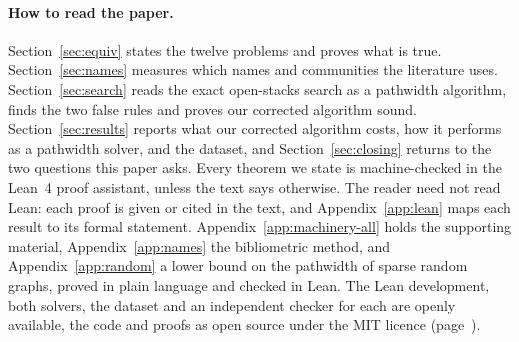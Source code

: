 \paragraph{How to read the paper.} Section~\ref{sec:equiv} states the twelve
problems and proves what is true. Section~\ref{sec:names} measures which names
and communities the literature uses. Section~\ref{sec:search} reads the exact
open-stacks search as a pathwidth algorithm, finds the two false rules and
proves our corrected algorithm sound. Section~\ref{sec:results} reports what our
corrected algorithm costs, how it performs as a pathwidth solver, and the dataset, and Section~\ref{sec:closing} returns to the two questions this paper asks.
Every theorem we state is machine-checked in the Lean~4 proof assistant, unless
the text says otherwise. The
reader need not read Lean: each proof is given or cited in the text, and
Appendix~\ref{app:lean} maps each result to its formal statement.
Appendix~\ref{app:machinery-all} holds the supporting material,
Appendix~\ref{app:names} the bibliometric method, and
Appendix~\ref{app:random} a lower bound on the pathwidth of sparse random
graphs, proved in plain language and checked in Lean. The Lean development,
both solvers, the dataset and an independent checker for each are openly
available, the code and proofs as open source under the MIT licence
(page~\pageref{sec:data}).
